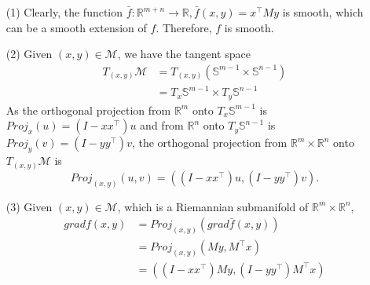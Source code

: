 \documentclass[en, oneside]{assignment}
\begin{document}
\begin{sol}
    \begin{itemize}
        \item[(1)] Clearly, the function $\bar{f}: \mathbb{R}^{m+n} \rightarrow \mathbb{R}, \bar{f}(x, y) = x^{\top} M y$ is smooth, 
        which can be a smooth extension of $f$. Therefore, $f$ is smooth.
        \item[(2)] Given $(x, y) \in \mathcal{M}$, we have the tangent space
        \begin{align*}
            T_{(x, y)}\mathcal{M} & = T_{(x, y)}(\mathbb{S}^{m-1} \times \mathbb{S}^{n-1})\\
            & = T_x \mathbb{S}^{m-1} \times T_y \mathbb{S}^{n-1}
        \end{align*}
        As the orthogonal projection from $\mathbb{R}^{m}$ onto $T_x \mathbb{S}^{m-1}$ is $Proj_x(u) = (I - xx^{\top})u$ 
        and from $\mathbb{R}^{n}$ onto $T_y \mathbb{S}^{n-1}$ is $Proj_y(v) = (I - yy^{\top})v$,
        the orthogonal projection from $\mathbb{R}^{m} \times \mathbb{R}^{n}$ onto $T_{(x, y)}\mathcal{M}$ is
        \begin{equation*}
            Proj_{(x, y)}(u, v) = ((I - xx^{\top})u, (I - yy^{\top})v).
        \end{equation*}
        \item[(3)] Given $(x, y) \in \mathcal{M}$, which is a Riemannian submanifold of $\mathbb{R}^{m} \times \mathbb{R}^{n}$,
        \begin{align*}
            gradf(x, y) & = Proj_{(x, y)}(grad \bar{f}(x, y))\\
            & = Proj_{(x, y)}(M y, M^{\top} x)\\
            & = ((I - xx^{\top})M y, (I - yy^{\top})M^{\top} x)
        \end{align*}
    \end{itemize}
\end{sol}
\end{document}
